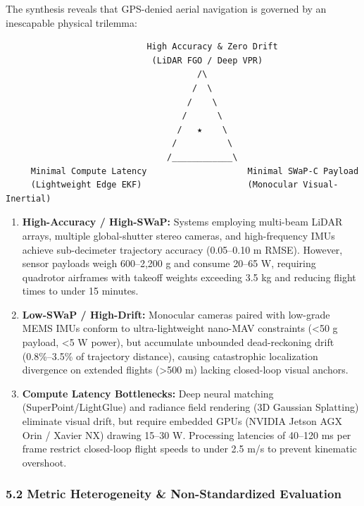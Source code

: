 \documentclass[journal]{IEEEtran}
\begin{document}
The synthesis reveals that GPS-denied aerial navigation is governed by
an inescapable physical trilemma:

\begin{verbatim}
                            High Accuracy & Zero Drift
                             (LiDAR FGO / Deep VPR)
                                      /\
                                     /  \
                                    /    \
                                   /      \
                                  /   ★    \
                                 /          \
                                /____________\
     Minimal Compute Latency                    Minimal SWaP-C Payload
     (Lightweight Edge EKF)                     (Monocular Visual-Inertial)
\end{verbatim}

\begin{enumerate}
\def\labelenumi{\arabic{enumi}.}
\tightlist
\item
  \textbf{High-Accuracy / High-SWaP:} Systems employing multi-beam LiDAR
  arrays, multiple global-shutter stereo cameras, and high-frequency
  IMUs achieve sub-decimeter trajectory accuracy (0.05--0.10 m RMSE).
  However, sensor payloads weigh 600--2,200 g and consume 20--65 W,
  requiring quadrotor airframes with takeoff weights exceeding 3.5 kg
  and reducing flight times to under 15 minutes.
\item
  \textbf{Low-SWaP / High-Drift:} Monocular cameras paired with
  low-grade MEMS IMUs conform to ultra-lightweight nano-MAV constraints
  (\textless50 g payload, \textless5 W power), but accumulate unbounded
  dead-reckoning drift (0.8\%--3.5\% of trajectory distance), causing
  catastrophic localization divergence on extended flights
  (\textgreater500 m) lacking closed-loop visual anchors.
\item
  \textbf{Compute Latency Bottlenecks:} Deep neural matching
  (SuperPoint/LightGlue) and radiance field rendering (3D Gaussian
  Splatting) eliminate visual drift, but require embedded GPUs (NVIDIA
  Jetson AGX Orin / Xavier NX) drawing 15--30 W. Processing latencies of
  40--120 ms per frame restrict closed-loop flight speeds to under 2.5
  m/s to prevent kinematic overshoot.
\end{enumerate}

\subsubsection{5.2 Metric Heterogeneity \& Non-Standardized
Evaluation}\label{metric-heterogeneity-non-standardized-evaluation}
\end{document}
